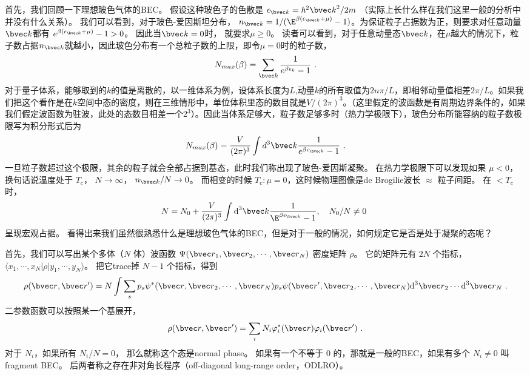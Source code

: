 
首先，我们回顾一下理想玻色气体的BEC。 假设这种玻色子的色散是 $\epsilon_{\bvec k} = \hbar^2{\bvec k}^2/2m$ （实际上长什么样在我们这里一般的分析中并没有什么关系）。 我们可以看到，对于玻色-爱因斯坦分布， $n_{\bvec k}=1/(\E^{\beta(\epsilon_{\bvec k}+\mu)}-1)$。为保证粒子占据数为正，则要求对任意动量$\bvec k$都有 $e^{\beta (\epsilon_{\bvec k}+\mu)}-1>0$。 因此当$\bvec k = 0$时， 就要求$\mu \geq 0$。 读者可以看到，对于任意动量态$\bvec k$，在$\mu$越大的情况下，粒子数占据$n_{\bvec k}$就越小，因此玻色分布有一个总粒子数的上限，即令$\mu = 0$时的粒子数，
\begin{equation}
N_{max}(\beta) = \sum_{\bvec k} \frac{1}{e^{\beta \epsilon_k}-1}~.
\end{equation}
对于量子体系，能够取到的$k$的值是离散的，以一维体系为例，设体系长度为$L$,动量$k$的所有取值为$2 n\pi/L$，即相邻动量值相差$2\pi/L$。如果我们把这个看作是在$k$空间中态的密度，则在三维情形中，单位体积里态的数目就是$V/(2 \pi)^3$。（这里假定的波函数是有周期边界条件的，如果我们假定波函数为驻波，此处的态数目相差一个$2^3$）。因此当体系足够大，粒子数足够多时（热力学极限下），玻色分布所能容纳的粒子数极限写为积分形式后为
\begin{equation}
N_{max}(\beta) = \frac{V}{(2\pi)^3}\int d^3 \bvec k \frac{1}{e^{\beta \epsilon_{\bvec k}}-1}~.
\end{equation}
一旦粒子数超过这个极限，其余的粒子就会全部占据到基态，此时我们称出现了玻色-爱因斯凝聚。
 在热力学极限下可以发现如果 $\mu<0$，换句话说温度处于 $T_c$， $N\to\infty$， $n_{\bvec k}/N\to 0$。 而相变的时候 $T_c: \mu=0$，这时候物理图像是de Brogilie波长 $\approx$ 粒子间距。 在 $<T_c$ 时，
\begin{equation}
N=N_0+\frac{V}{(2\pi)^3}\int \text{d}^3{\bvec k}\frac{1}{\E^{\beta\epsilon_{\bvec k}}-1},\quad N_0/N\neq0~
\end{equation}
呈现宏观占据。 看得出来我们虽然很熟悉什么是理想玻色气体的BEC，但是对于一般的情况，如何规定它是否是处于凝聚的态呢？

首先，我们可以写出某个多体（$N$ 体）波函数 $\Psi({\bvec r}_1,{\bvec r}_2,\cdots,{\bvec r}_N)$ 密度矩阵 $\rho$。 它的矩阵元有 $2N$ 个指标， $\langle x_1,\cdots,x_N|\rho|y_1,\cdots,y_N\rangle$。 把它trace掉 $N-1$ 个指标，得到
\begin{equation}
\rho({\bvec r},{\bvec r'}) = N\int\sum_s p_s\psi^*({\bvec r},{\bvec r}_2,\cdots,{\bvec r}_N)p_s\psi({\bvec r'},{\bvec r}_2,\cdots,{\bvec r}_N)\text{d}^3{\bvec r}_2\cdots\text{d}^3{\bvec r}_N~.
\end{equation}
二参数函数可以按照某一个基展开，
\begin{equation}
\rho({\bvec r},{\bvec r'}) = \sum_i N_i \varphi_i^*({\bvec r})\varphi_i({\bvec r'})~.
\end{equation}
对于 $N_i$，如果所有 $N_i/N=0$， 那么就称这个态是normal phase。 如果有一个不等于 $0$ 的，那就是一般的BEC，如果有多个 $N_i\neq0$ 叫 fragment BEC。 后两者称之存在非对角长程序（off-diagonal long-range order，ODLRO）。

